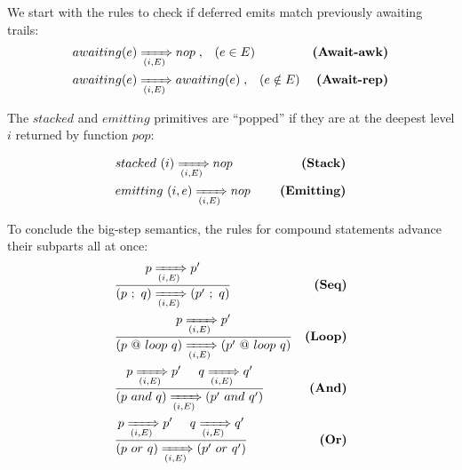 We start with the rules to check if deferred emits match previously awaiting 
trails:
%
\begin{eqnarray*}
& awaiting(e) \xRightarrow[(i,E)]{} nop \;,\;\;\; (e \in E)
    & \textbf{(Await-awk)}    \\
& awaiting(e) \xRightarrow[(i,E)]{} awaiting(e) \;,\;\;\; (e \notin E)
    & \textbf{(Await-rep)}    \\
\end{eqnarray*}

The $stacked$ and $emitting$ primitives are ``popped'' if they are at the 
deepest level $i$ returned by function $pop$:

\begin{eqnarray*}
& stacked~(i) \BT nop \5
    & \textbf{(Stack)}  \\
%
& emitting~(i,e) \BT nop \5
    & \textbf{(Emitting)}  %
\end{eqnarray*}

\begin{comment}
A deferred emit cannot unblock immediately because the just matched trails 
(rule \textbf{Await-awk}) must all react before the emit continuation proceeds.
Hence, rule \textbf{Stack} specifies that the emit continuation remains blocked 
at the same (low) depth.
This way, awaken trails will execute in the next small-step sequence and new 
emits will be deferred at deeper depths (note the \code{i+1} in small-step rule 
\textbf{emit}).
Eventually, no new emits will take place, and function $pop$ will pop the 
continuations with the highest depth, which will proceed through rule 
\textbf{Cont}, providing the desired stacked execution for internal events.
\end{comment}

To conclude the big-step semantics, the rules for compound statements advance 
their subparts all at once:
%
\begin{eqnarray*}
& \frac
    { p \BT p' }
    { (p~;~q) \BT (p'~;~q) }
    & \textbf{(Seq)}    \\
& \frac
    { p \BT p' }
    { (p~@~loop~q) \BT (p'~@~loop~q) }
    & \textbf{(Loop)}   \\
& \frac
    { p \BT p' \5 q \BT q' }
    { (p~and~q) \BT (p'~and~q') }
    & \textbf{(And)}    \\
& \frac
    { p \BT p' \5 q \BT q' }
    { (p~or~q) \BT (p'~or~q') }
    & \textbf{(Or)}     %
\end{eqnarray*}

